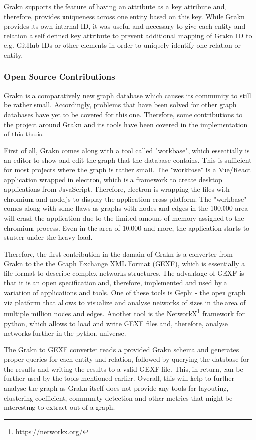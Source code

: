 Grakn supports the feature of having an attribute as a key attribute and, therefore, provides uniqueness across one entity based on this key. While Grakn provides its own internal ID, it was useful and necessary to give each entity and relation a self defined key attribute to prevent additional mapping of Grakn ID to e.g. GitHub IDs or other elements in order to uniquely identify one relation or entity.

\subsubsection{Open Source Contributions}
\label{sec:opensource}
Grakn is a comparatively new graph database which causes its community to still be rather small. Accordingly, problems that have been solved for other graph databases have yet to be covered for this one. Therefore, some contributions to the project around Grakn and its tools have been covered in the implementation of this thesis.

First of all, Grakn comes along with a tool called "workbase", which essentially is an editor to show and edit the graph that the database contains. This is sufficient for most projects where the graph is rather small. The "workbase" is a Vue/React application wrapped in electron, which is a framework to create desktop applications from JavaScript. Therefore, electron is wrapping the files with chromium and node.js to display the application cross platform. The "workbase" comes along with some flaws as graphs with nodes and edges in the 100.000 area will crash the application due to the limited amount of memory assigned to the chromium process. Even in the area of 10.000 and more, the application starts to stutter under the heavy load.

Therefore, the first contribution in the domain of Grakn is a converter from Grakn to the the Graph Exchange XML Format (GEXF), which is essentially a file format to describe complex networks structures.
The advantage of GEXF is that it is an open specification and, therefore, implemented and used by a variation of applications and tools. One of these tools is Gephi - the open graph viz platform that allows to visualize and analyse networks of sizes in the area of multiple million nodes and edges. Another tool is the NetworkX\footnote{https://networkx.org/} framework for python, which allows to load and write GEXF files and, therefore, analyse networks further in the python universe.

The Grakn to GEXF converter reads a provided Grakn schema and generates proper queries for each entity and relation, followed by querying the database for the results and writing the results to a valid GEXF file. This, in return, can be further used by the tools mentioned earlier. Overall, this will help to further analyse the graph as Grakn itself does not provide any tools for layouting, clustering coefficient, community detection and other metrics that might be interesting to extract out of a graph.

